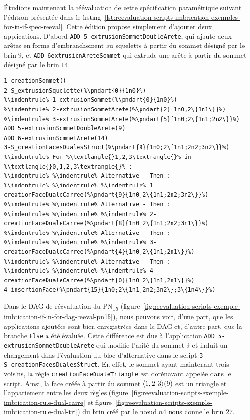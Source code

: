 Étudions maintenant la réévaluation de cette spécification paramétrique suivant
l'édition présentée dans le
listing~\ref{lst:reevaluation-scripts-imbrication-exemples-for-in-if-spec-reeval}. %
Cette édition propose simplement d'ajouter deux applications. %
D'abord \texttt{ADD 5\allowbreak{}-\allowbreak{}extrusionSommetDoubleArete}, qui
ajoute deux arêtes en forme d'embranchement au squelette à partir du sommet désigné par le brin
\(9\), et \texttt{ADD 6\allowbreak{}\-\allowbreak{}extrusionAreteSommet} qui
extrude une arête à partir du sommet désigné par le brin \(14\). %

\noindent
\begin{minipage}{\textwidth}
	\begin{lstlisting}[style=script-style,
escapechar=\%,
caption=Spécification paramétrique initiale de la création du dual d'un squelette 1D,
label=lst:reevaluation-scripts-imbrication-exemples-for-in-if-spec-reeval,
captionpos=b]
1-creationSommet()
2-S_extrusionSquelette(%\pndart{0}{1n0}%)
%\indentrule% 1-extrusionSommet(%\pndart{0}{1n0}%)
%\indentrule% 2-extrusionSommetArete(%\pndart{2}{1n0;2\{1n1\}}%)
%\indentrule% 3-extrusionSommetArete(%\pndart{5}{1n0;2\{1n1;2n2\}}%)
ADD 5-extrusionSommetDoubleArete(9)
ADD 6-extrusionSommetArete(14)
3-S_creationFacesDualesStruct(%\pndart{9}{1n0;2\{1n1;2n2;3n2\}}%)
%\indentrule% For %\textlangle{}1,2,3\textrangle{}% in %\textlangle{}0,1,2,3\textrangle{}% :
%\indentrule% %\indentrule% Alternative - Then :
%\indentrule% %\indentrule% %\indentrule% 1-creationFaceDualeCarree(%\pndart{9}{1n0;2\{1n1;2n2;3n2\}}%)
%\indentrule% %\indentrule% Alternative - Then :
%\indentrule% %\indentrule% %\indentrule% 2-creationFaceDualeCarree(%\pndart{8}{1n0;2\{1n1;2n2;3n1\}}%)
%\indentrule% %\indentrule% Alternative - Then :
%\indentrule% %\indentrule% %\indentrule% 3-creationFaceDualeCarree(%\pndart{4}{1n0;2\{1n1;2n1\}}%)
%\indentrule% %\indentrule% Alternative - Then :
%\indentrule% %\indentrule% %\indentrule% 4-creationFaceDualeCarree(%\pndart{0}{1n0;2\{1n1;2n1\}}%)
4-insertionFace(%\pndart{15}{1n0;2\{1n1;2n2;3n2\};3\{1n4\}}%)
\end{lstlisting}
\end{minipage}

Dans le DAG de réévaluation du PN\textsubscript{15}
(figure~\ref{fig:reevaluation-scripts-exemple-imbrication-if-in-for-dag-reeval-pn15}),
nous pouvons voir, d'une part, que les applications ajoutées sont bien
enregistrées dans le DAG et, d'autre part, que la branche \texttt{Else} a été
évaluée. %
Cette différence est due à l'application \texttt{ADD
	5-extrusionSommetDoubleArete} qui modifie l'arité du sommet \(9\) et induit un
changement dans l'évaluation du bloc d'alternative dans le script
\texttt{3-\allowbreak{}S\allowbreak\_creationFacesDualesStruct}. En effet, le
sommet ayant maintenant trois voisins, la règle
\texttt{creationFaceDualeTriangle} est dorénavant appelée dans le script. %
Ainsi, la face créée à partir du sommet \(\langle1,2,3\rangle(9)\) est un triangle et
l'appariement entre les deux règles
(figure~\ref{fig:reevaluation-scripts-exemple-imbrication-rule-dual-carre} et
figure~\ref{fig:reevaluation-scripts-exemple-imbrication-rule-dual-tri}) du brin
créé par le n\oe ud \(n4\) nous donne le brin \(27\). %

